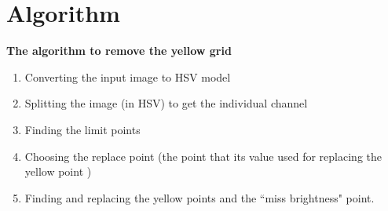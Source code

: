\section{Algorithm}
\textbf{The algorithm to remove the yellow grid}\\
\begin{algorithm}[H]
\begin{enumerate}
\item Converting the input image to HSV model
\item Splitting the image (in HSV) to get the individual channel
\item Finding the limit points
\item Choosing the replace point (the point that its value used for replacing the yellow point )
\item Finding and replacing the yellow points and the ``miss brightness" point.
\end{enumerate}
\end{algorithm}






































